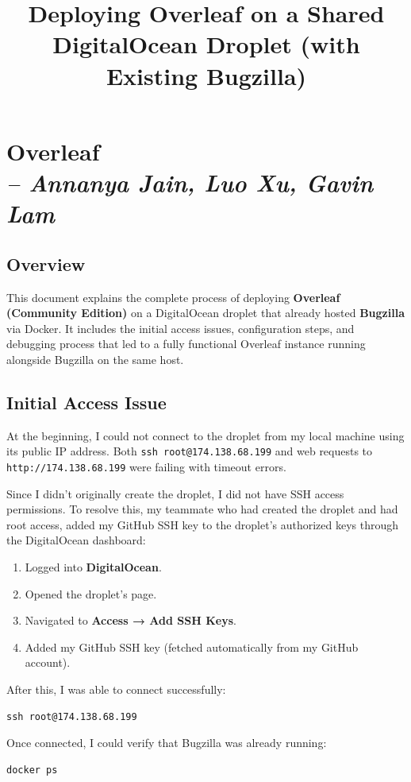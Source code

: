 \chapter{Overleaf \\
\small{\textit{-- Annanya Jain, Luo Xu, Gavin Lam}
\label{Chapter::Overleaf}}}

\title{Deploying Overleaf on a Shared DigitalOcean Droplet (with Existing Bugzilla)}
\section{Overview}
This document explains the complete process of deploying \textbf{Overleaf (Community Edition)} on a DigitalOcean droplet that already hosted \textbf{Bugzilla} via Docker.  
It includes the initial access issues, configuration steps, and debugging process that led to a fully functional Overleaf instance running alongside Bugzilla on the same host.

\section{Initial Access Issue}
At the beginning, I could not connect to the droplet from my local machine using its public IP address.  
Both \texttt{ssh root@174.138.68.199} and web requests to \texttt{http://174.138.68.199} were failing with timeout errors.

Since I didn’t originally create the droplet, I did not have SSH access permissions. To resolve this, my teammate who had created the droplet and had root access, added my GitHub SSH key to the droplet’s authorized keys through the DigitalOcean dashboard:

\begin{enumerate}
  \item Logged into \textbf{DigitalOcean}.
  \item Opened the droplet’s page.
  \item Navigated to \textbf{Access → Add SSH Keys}.
  \item Added my GitHub SSH key (fetched automatically from my GitHub account).
\end{enumerate}

After this, I was able to connect successfully:
\begin{verbatim}
ssh root@174.138.68.199
\end{verbatim}

Once connected, I could verify that Bugzilla was already running:
\begin{verbatim}
docker ps
\end{verbatim}

